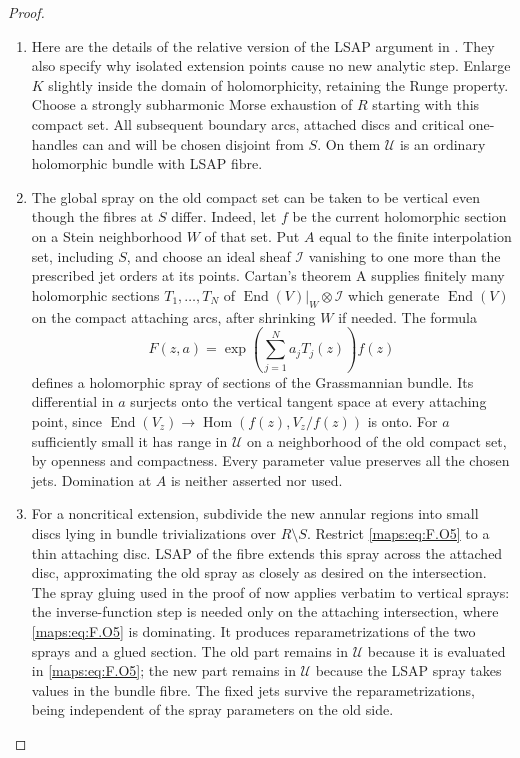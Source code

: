 \begin{proof}
\begin{enumerate}[label=\arabic*.]
\item Here are the details of the relative version of the LSAP argument
in \cite[Lemma 5.1, Theorem 6.1 and Proposition 7.13(d)]
{IVVOkaOneV5}.  They also specify why isolated extension
points cause no new analytic step.  Enlarge $K$ slightly inside
the domain of holomorphicity, retaining the Runge property.
Choose a strongly subharmonic Morse exhaustion of $R$ starting
with this compact set.  All subsequent boundary arcs, attached
discs and critical one-handles can and will be chosen disjoint
from $S$.  On them $\mathscr U$ is an ordinary holomorphic
bundle with LSAP fibre.

\item The global spray on the old compact set can be taken to be
vertical even though the fibres at $S$ differ.  Indeed, let $f$
be the current holomorphic section on a Stein neighborhood $W$
of that set.  Put $A$ equal to the finite interpolation set,
including $S$, and choose an ideal sheaf $\mathcal I$ vanishing
to one more than the prescribed jet orders at its points.
Cartan's theorem A supplies finitely many holomorphic sections
$T_1,\ldots,T_N$ of
$\operatorname{End}(V)|_W\otimes\mathcal I$ which generate
$\operatorname{End}(V)$ on the compact attaching arcs, after
shrinking $W$ if needed.  The formula
\[
 F(z,a)=\exp\left(\sum_{j=1}^N a_jT_j(z)\right)f(z)
 \tag{F.O5}\label{maps:eq:F.O5}
\]
defines a holomorphic spray of sections of the Grassmannian
bundle.  Its differential in $a$ surjects onto the vertical
tangent space at every attaching point, since
$\operatorname{End}(V_z)\to
\operatorname{Hom}(f(z),V_z/f(z))$ is onto.
For $a$ sufficiently small it has range in $\mathscr U$ on
a neighborhood of the old compact set, by openness and
compactness.  Every parameter value preserves all the chosen
jets.  Domination at $A$ is neither asserted nor used.

\item For a noncritical extension, subdivide the new annular regions
into small discs lying in bundle trivializations over
$R\setminus S$.  Restrict \eqref{maps:eq:F.O5} to a thin attaching disc.
LSAP of the fibre extends this spray across the attached disc,
approximating the old spray as closely as desired on the
intersection.  The spray gluing used in the proof of
\cite[Lemma 5.1, equations (5.6)--(5.8)]
{IVVOkaOneV5} now applies verbatim to vertical sprays:
the inverse-function step is needed only on the attaching
intersection, where \eqref{maps:eq:F.O5} is dominating.  It produces
reparametrizations of the two sprays and a glued section.
The old part remains in $\mathscr U$ because it is evaluated
in \eqref{maps:eq:F.O5}; the new part remains in $\mathscr U$ because the
LSAP spray takes values in the bundle fibre.  The fixed jets
survive the reparametrizations, being independent of the
spray parameters on the old side.


\end{enumerate}
\end{proof}
